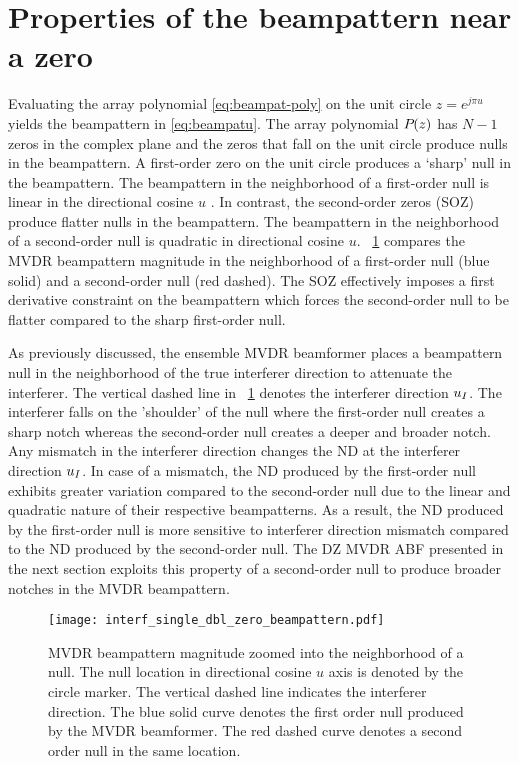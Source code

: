 \section{Properties of the beampattern near a zero}
\label{sec:second-order-zeros}
Evaluating the array polynomial \eqref{eq:beampat-poly} on the unit
circle $z = e^{j\pi u}$ yields the beampattern in
\eqref{eq:beampatu}. The array polynomial ${P}_{}(z)$ has $N - 1$
zeros in the complex plane and the zeros that fall on the unit circle
produce nulls in the beampattern. A first-order zero on the unit
circle produces a `sharp' null in the beampattern. The beampattern in
the neighborhood of a first-order null is linear in the directional
cosine $u$ \cite[Sec.~3.2.3]{vtree2002oap}\cite{Steinberg1976}. In contrast, the
second-order zeros (SOZ) produce flatter nulls in the beampattern. The
beampattern in the neighborhood of a second-order null is quadratic in
directional cosine $u$. \figurename{}~\ref{fig:mvdr-null-zero}
compares the MVDR beampattern magnitude in the neighborhood of a first-order
null (blue solid) and a second-order null (red dashed). The SOZ effectively
imposes a first derivative constraint on the beampattern which forces
the second-order null to be flatter compared to the sharp first-order
null.

As previously discussed, the ensemble MVDR beamformer places a
beampattern null in the neighborhood of the true interferer direction
to attenuate the interferer. The vertical dashed line in
\figurename{}~\ref{fig:mvdr-null-zero} denotes the interferer
direction $u_I$. The interferer falls on the 'shoulder' of the
null where the first-order null creates a sharp notch whereas the
second-order null creates a deeper and broader notch. Any mismatch in
the interferer direction changes the ND at the interferer direction
$u_I$. In case of a mismatch, the ND produced by the first-order
null exhibits greater variation compared to the second-order null due
to the linear and quadratic nature of their respective
beampatterns. As a result, the ND produced by the first-order null is
more sensitive to interferer direction mismatch compared to the ND
produced by the second-order null. The DZ MVDR ABF presented in the
next section exploits this property of a second-order null to produce
broader notches in the MVDR beampattern.

\begin{figure}[!hp]
  \centering
  \texttt{[image: interf\_single\_dbl\_zero\_beampattern.pdf]}
  \caption[MVDR beampattern magnitude zoomed into the neighborhood of
    a null.]{MVDR beampattern magnitude zoomed into the neighborhood of
    a null. The null location in directional cosine $u$ axis is
    denoted by the circle marker.  The vertical dashed line indicates
    the interferer direction. The blue solid curve denotes the first
    order null produced by the MVDR beamformer. The red dashed curve
    denotes a second order null in the same location.}
  \label{fig:mvdr-null-zero}
\end{figure}

